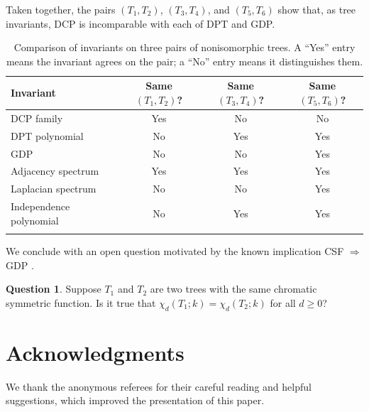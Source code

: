 \documentclass[12pt,reqno]{amsart}
\theoremstyle{definition}
\newtheorem{quest}[thm]{Question}
\begin{document}
Taken together, the pairs $(T_1,T_2)$, $(T_3,T_4)$, and $(T_5,T_6)$ show that, as tree invariants, DCP is incomparable with each of DPT and GDP.

\begin{table}[ht]
\centering
\begin{tabular}{lccc}
\toprule
Invariant & Same $(T_1,T_2)$? & Same $(T_3,T_4)$? & Same $(T_5,T_6)$? \\
\midrule
DCP family & Yes & No & No \\
DPT polynomial & No & Yes & Yes \\
GDP & No & No & Yes \\
Adjacency spectrum & Yes & Yes & Yes \\
Laplacian spectrum & No & No & Yes \\
Independence polynomial & No & Yes & Yes \\
\bottomrule \\ 
\end{tabular}
\caption{Comparison of invariants on three pairs of nonisomorphic trees. A ``Yes'' entry means the invariant agrees on the pair; a ``No'' entry means it distinguishes them.}
\label{tab:invariant-comparison}
\end{table}

We conclude with an open question motivated by the known implication CSF $\Rightarrow$ GDP \cite[Theorem~6]{A-PMWZ24}.

\begin{quest}
Suppose $T_1$ and $T_2$ are two trees with the same chromatic symmetric function. Is it true that $\chi_{d}(T_1;k)=\chi_{d}(T_2;k)$ for all $d\geq 0$?
\end{quest}

\section*{Acknowledgments}
We thank the anonymous referees for their careful reading and helpful suggestions, which improved the presentation of this paper.



\end{document}
